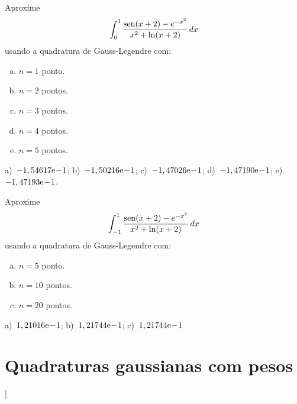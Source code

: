 \begin{exer}\label{exer:GL_mudvar}
  Aproxime
  \begin{equation}
    \int_{0}^1 \frac{\operatorname{sen}(x+2)-e^{-x^2}}{x^2+\ln(x+2)}\,dx
  \end{equation}
usando a quadratura de Gauss-Legendre com:
\begin{enumerate}[a)]
\item $n=1$ ponto.
\item $n=2$ pontos.
\item $n=3$ pontos.
\item $n=4$ pontos.
\item $n=5$ pontos.
\end{enumerate}
\end{exer}
\begin{resp}
  a)~$-1,54617\mathrm{e}\!-\!1$; b)~$-1,50216\mathrm{e}\!-\!1$; c)~$-1,47026\mathrm{e}\!-\!1$; d)~$-1,47190\mathrm{e}\!-\!1$; e)~$-1,47193\mathrm{e}\!-\!1$.
\end{resp}

\begin{exer}\label{exer:GL_Npts}
  Aproxime
  \begin{equation}
    \int_{-1}^1 \frac{\operatorname{sen}(x+2)-e^{-x^2}}{x^2+\ln(x+2)}\,dx
  \end{equation}
usando a quadratura de Gauss-Legendre com:
\begin{enumerate}[a)]
\item $n=5$ ponto.
\item $n=10$ pontos.
\item $n=20$ pontos.
\end{enumerate}
\end{exer}
\begin{resp}
  a)~$1,21016\mathrm{e}\!-\!1$; b)~$1,21744\mathrm{e}\!-\!1$; c)~$1,21744\mathrm{e}\!-\!1$
\end{resp}

\section{Quadraturas gaussianas com pesos}\label{cap_integr_sec_Gauss_peso}

\begin{flushleft}
  [[tag:revisar]]
\end{flushleft}

